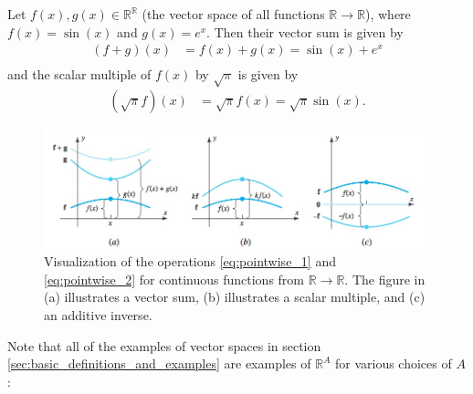 \documentclass[12pt,letterpaper,reqno]{article}
\numberwithin{equation}{section}
\begin{document}
\begin{example}
Let $f(x), g(x) \in \mathbb{R}^\mathbb{R}$ (the vector space of all functions $\mathbb{R} \to \mathbb{R}$), where $f(x)=\sin(x)$ and $g(x)=e^x$. Then their vector sum is given by
\begin{align*}
	(f+g)(x)&=f(x)+g(x)=\sin(x)+e^x \\
\end{align*}
and the scalar multiple of $f(x)$ by $\sqrt{\pi}$ is given by
\begin{align*}
	(\sqrt{\pi}f)(x)&=\sqrt{\pi}f(x)=\sqrt{\pi}\sin(x).
\end{align*}	
\end{example}

\begin{figure}[h]
	\begin{center}
	\includegraphics[scale=0.5]{figures_mvc/function_operations}
\end{center}
\caption{Visualization of the operations \eqref{eq:pointwise_1} and \eqref{eq:pointwise_2} for continuous functions from $\mathbb{R} \to \mathbb{R}$. The figure in (a) illustrates a vector sum, (b) illustrates a scalar multiple, and (c) an additive inverse.}
\end{figure}





Note that all of the examples of vector spaces in section \ref{sec:basic_definitions_and_examples} are examples of $\mathbb{R}^A$ for various choices of $A$:
\end{document}
